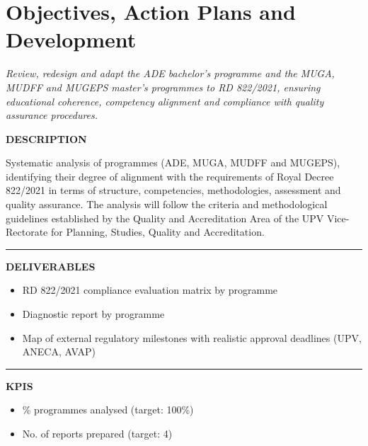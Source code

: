 \documentclass[11pt,a4paper]{scrreprt}
\newcommand{\fieldlabel}[1]{%
  {\footnotesize\sffamily\bfseries\color{mutedcolor}\MakeUppercase{#1}}\par\nopagebreak[4]
}
\newcommand{\fieldsep}{\vspace{3pt}\noindent\textcolor{bordercolor}{\rule{\linewidth}{0.4pt}}\vspace{3pt}\par}
\begin{document}
\newpage

\section{Objectives, Action Plans and Development}
{\small\color{mutedcolor}\itshape Review, redesign and adapt the ADE bachelor's programme and the MUGA, MUDFF and MUGEPS master's programmes to RD 822/2021, ensuring educational coherence, competency alignment and compliance with quality assurance procedures.}\par\vspace{6pt}

\begin{tcolorbox}[pabox={aacolor}{A.P.1.1 \enspace\textbullet\enspace Diagnosis and Analysis of Adaptation to RD 822/2021}]

\fieldlabel{Description}
{\small Systematic analysis of programmes (ADE, MUGA, MUDFF and MUGEPS), identifying their degree of alignment with the requirements of Royal Decree 822/2021 in terms of structure, competencies, methodologies, assessment and quality assurance. The analysis will follow the criteria and methodological guidelines established by the Quality and Accreditation Area of the UPV Vice-Rectorate for Planning, Studies, Quality and Accreditation.}\par
\fieldsep
\fieldlabel{Deliverables}
{\small \begin{itemize}[noitemsep,topsep=2pt]
\item RD 822/2021 compliance evaluation matrix by programme
\item Diagnostic report by programme
\item Map of external regulatory milestones with realistic approval deadlines (UPV, ANECA, AVAP)
\end{itemize}}\par
\fieldsep
\fieldlabel{KPIs}
{\small \begin{itemize}[noitemsep,topsep=2pt]
\item \% programmes analysed (target: 100\%)
\item No. of reports prepared (target: 4)
\end{itemize}}\par
\end{tcolorbox}
\end{document}
